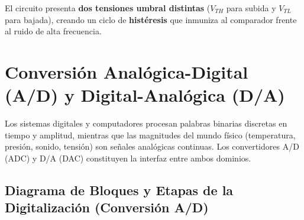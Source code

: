 \begin{center}
\end{center}

El circuito presenta \textbf{dos tensiones umbral distintas} ($V_{TH}$ para subida y $V_{TL}$ para bajada), creando un ciclo de \textbf{histéresis} que inmuniza al comparador frente al ruido de alta frecuencia.

\section{Conversión Analógica-Digital (A/D) y Digital-Analógica (D/A)}

Los sistemas digitales y computadores procesan palabras binarias discretas en tiempo y amplitud, mientras que las magnitudes del mundo físico (temperatura, presión, sonido, tensión) son señales analógicas continuas. Los convertidores A/D (ADC) y D/A (DAC) constituyen la interfaz entre ambos dominios.

\subsection{Diagrama de Bloques y Etapas de la Digitalización (Conversión A/D)}


